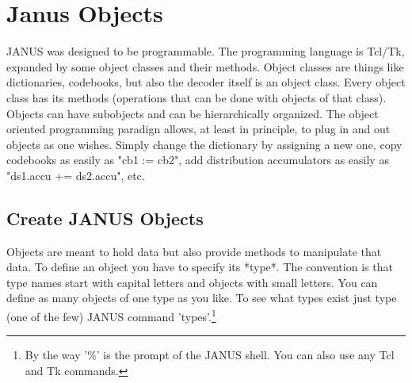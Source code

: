 
\section{Janus Objects}

JANUS was designed to be programmable. The programming language is
Tcl/Tk, expanded by some object classes and their methods. Object
classes are things like dictionaries, codebooks, but also the decoder
itself is an object class. Every object class has its methods
(operations that can be done with objects of that class). Objects can
have subobjects and can be hierarchically organized. The object oriented
programming paradign allows, at least in principle, to plug in and out
objects as one wishes. Simply change the dictionary by assigning a new
one, copy codebooks as easily as "cb1 := cb2", add distribution
accumulators as easily as "ds1.accu += ds2.accu", etc.

\subsection*{Create JANUS Objects}

Objects are meant to hold data but also provide methods to manipulate
that data. To define an object you have to specify its *type*. The
convention is that type names start with capital letters and objects
with small letters. You can define as many objects of one type as you
like. To see what types exist just type (one of the few) JANUS command
'types'.\footnote{By the way '\%' is the prompt of the JANUS shell.
 You can also use any Tcl and Tk commands.}

